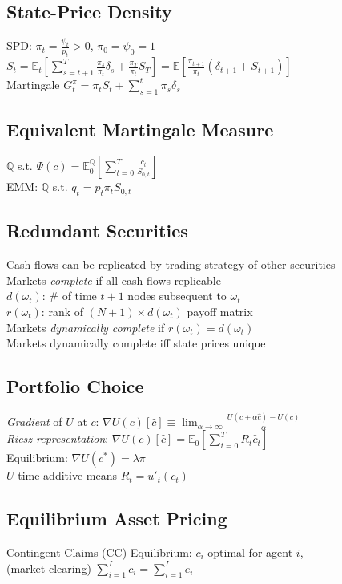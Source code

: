 	\subsection*{State-Price Density}
	SPD: $\pi_{t} = \frac{\psi_{t}}{p_{t}} > 0$, $\pi_{0} = \psi_{0} = 1$\\
	$S_{t} = \mathbb{E}_{t}\left[\sum_{s=t+1}^{T}\frac{\pi_{s}}{\pi_{t}}\delta_{s} + \frac{\pi_{T}}{\pi_{t}}S_{T}\right] = \mathbb{E}\left[\frac{\pi_{t+1}}{\pi_{t}}\left(\delta_{t+1} + S_{t+1}\right)\right]$\\
	Martingale $G_{t}^{\pi} = \pi_{t}S_{t} + \sum_{s=1}^{t}\pi_{s}\delta_{s}$
	
	\subsection*{Equivalent Martingale Measure}
	$\mathbb{Q}$ s.t. $\Psi\left(c\right) = \mathbb{E}_{0}^{\mathbb{Q}}\left[\sum_{t=0}^{T}\frac{c_{t}}{S_{0,t}}\right]$\\
	EMM: $\mathbb{Q}$ s.t. $q_{t} = p_{t}\pi_{t}S_{0,t}$
	
	\subsection*{Redundant Securities}
	Cash flows can be replicated by trading strategy of other securities\\
	Markets \emph{complete} if all cash flows replicable\\
	$d\left(\omega_{t}\right)$: \# of time $t + 1$ nodes subsequent to $\omega_{t}$\\
	$r\left(\omega_{t}\right)$: rank of $\left(N + 1\right)\times d\left(\omega_{t}\right)$ payoff matrix\\
	Markets \emph{dynamically complete} if $r\left(\omega_{t}\right) = d\left(\omega_{t}\right)$\\
	Markets dynamically complete iff state prices unique
	
	\subsection*{Portfolio Choice}
	\emph{Gradient} of $U$ at $c$: $\nabla U\left(c\right)\left[\hat{c}\right]\equiv\lim_{\alpha\to\infty}\frac{U\left(c + \alpha\hat{c}\right) - U\left(c\right)}{\alpha}$\\
	\emph{Riesz representation}: $\nabla U\left(c\right)\left[\hat{c}\right] = \mathbb{E}_{0}\left[\sum_{t=0}^{T}R_{t}\hat{c}_{t}\right]$\\
	Equilibrium: $\nabla U\left(c^{\ast}\right) = \lambda\pi$\\
	$U$ time-additive means $R_{t} = u'_{t}\left(c_{t}\right)$
	
	\subsection*{Equilibrium Asset Pricing}
	Contingent Claims (CC) Equilibrium: $c_{i}$ optimal for agent $i$,\\
	(market-clearing) $\sum_{i=1}^{I}c_{i} = \sum_{i=1}^{I}e_{i}$
	